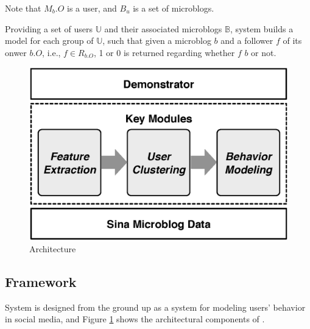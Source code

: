 Note that $M_b.O$ is a user, and $B_u$ is a set of microblogs.


Providing a set of users $\mathbb{U}$ and their associated microblogs $\mathbb{B}$, system \sys{} builds a \retg{} model for each group of  $\mathbb{U}$, such that given a microblog $b$ and a follower $f$ of its onwer $b.O$, i.e., $f \in R_{b.O}$, 1 or 0 is returned regarding whether $f$  $b$ or not.

\begin{figure}[tb!]
\centering
\includegraphics[width=.6\linewidth]{figures/architecture.eps}
\caption{\sys{} Architecture}
\label{fig:framework}
\vspace{-2ex}
\end{figure}



\subsection{\sys{} Framework}
System \sys{} is designed from the ground up as a system for modeling users' \retg{} behavior in social media, and
Figure \ref{fig:framework} shows the architectural components of \sys{}. %





